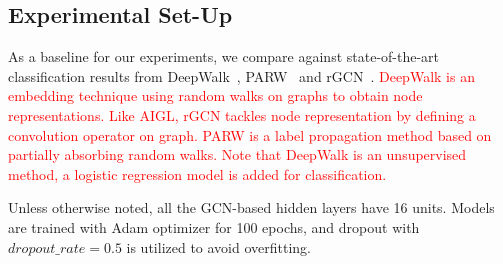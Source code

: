 \subsection{Experimental Set-Up}
As a baseline for our experiments, we compare against state-of-the-art classification results from DeepWalk~\cite{perozzi2014deepwalk}, PARW~\cite{wu2012learning} and rGCN~\cite{schlichtkrull2018modeling}. \textcolor{red}{DeepWalk is an embedding technique using random walks on graphs to obtain node representations. Like AIGL, rGCN tackles node representation by defining a convolution operator on graph. PARW is a label propagation method based on partially absorbing random walks. Note that DeepWalk is an unsupervised method, a logistic regression model is added for classification.}

Unless otherwise noted, all the GCN-based hidden layers have 16 units. Models are trained with Adam optimizer for 100 epochs, and dropout with $dropout\_rate=0.5$ is utilized to avoid overfitting.


